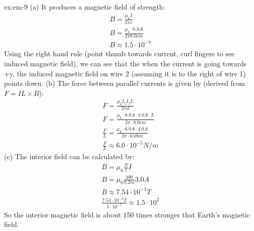 
\begin{solution}{ex:em-9}
  (a)
  It produces a magnetic field of strength:\\
  \[
    \begin{gathered}
      B=\frac{\mu_0I}{2\pi r}\\
      B=\frac{\mu_0\cdot 6.0A}{2\pi 8.0cm}\\
      B\approx 1.5\cdot10^{-7}
    \end{gathered}
  \]
  Using the right hand rule (point thumb towards current, curl fingers to see induced magnetic field), we can see that the when the current is going towards +y, the induced magnetic field on wire 2 (assuming it is to the right of wire 1) points down.
  (b)
  The force between parallel currents is given by (derived from $F=I\overline{L}\times \overline{B}$):
  \[
    \begin{gathered}
      F=\frac{\mu_0 I_1 I_2 L}{2\pi d}\\
      F=\frac{\mu_0 \cdot 6.0A \cdot 4.0A\cdot L}{2\pi \cdot 8.0cm}\\
      \frac{F}{L}=\frac{\mu_0 \cdot 6.0A \cdot 4.0A}{2\pi \cdot 0.08m}\\
      \frac{F}{L}\approx 6.0 \cdot 10^{-5} N/m
    \end{gathered}
  \]
  (c)
  The interior field can be calculated by:
  \[
    \begin{gathered}
      B=\mu_0 \frac{N}{\ell}I\\
      B=\mu_0 \frac{400}{0.2m} 3.0A\\
      B\approx 7.54 \cdot 10^{-3} T\\
      \frac{7.54 \cdot 10^{-3}T}{5 \cdot 10^{-5}} \approx 1.5 \cdot 10^2
    \end{gathered}
  \]
  So the interior magnetic field is about 150 times stronger that Earth's magnetic field.
\end{solution}
